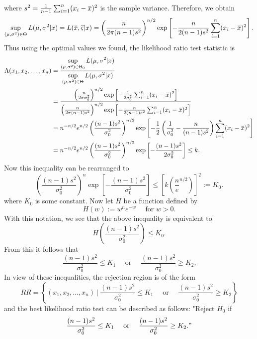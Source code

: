 where $s^2 = \frac{1}{n-1} \sum_{i=1}^{n} (x_i - \ols{x})^2$ is the sample variance. Therefore, we obtain
\[
    \sup_{(\mu, \sigma^2) \in \Theta} L(\mu, \sigma^2 | x) = L(\ols{x}, \widehat{\varsigma} | x) 
    = \left(\frac{n}{2\pi (n-1)s^2} \right)^{n/2} \exp\left[-\frac{n}{2(n-1)s^2} \sum_{i=1}^{n} (x_i - \ols{x})^2 \right].
\]
Thus using the optimal values we found, the likelihood ratio test statistic is
\begin{align*}
    \Lambda(x_1, x_2, \ldots, x_n) &= \frac{\displaystyle \sup_{(\mu, \sigma^2) \in \Theta_0} L(\mu, \sigma^2 | x)}{\displaystyle \sup_{(\mu, \sigma^2) \in \Theta} L(\mu, \sigma^2 | x)}\\
    &= \frac{\left(\frac{n}{2\pi \sigma^2_0} \right)^{n/2} \exp\left[-\frac{1}{2 \sigma^2_0} \sum_{i=1}^{n} (x_i - \ols{x})^2 \right]}{\left(\frac{n}{2\pi (n-1)s^2} \right)^{n/2} \exp\left[-\frac{n}{2(n-1)s^2} \sum_{i=1}^{n} (x_i - \ols{x})^2 \right]}\\
    &= n^{-n/2} e^{n/2} \left(\frac{(n-1)s^2}{\sigma^2_0}\right)^{n/2} \exp\left[-\frac{1}{2} \left(\frac{1}{\sigma^2_0} - \frac{n}{(n-1)s^2}\right) \sum_{i=1}^{n} (x_i - \ols{x})^2 \right]\\
    &= n^{-n/2} e^{n/2} \left(\frac{(n-1)s^2}{\sigma^2_0}\right)^{n/2} \exp\left[ - \frac{(n-1)s^2}{2\sigma^2_0}\right] \leq k.
\end{align*}
Now this inequality can be rearranged to
\[
    \left(\frac{(n-1)s^2}{\sigma^2_0}\right)^n \exp \left[-\frac{(n-1)s^2}{\sigma^2_0}\right] \leq \left[ k \left( \frac{n}{e}^{n/2} \right) \right]^2 := K_0.
\]
where $K_0$ is some constant. Now let $H$ be a function defined by
\[
    H(w) := w^n e^{-w} \quad \text{ for } w > 0.
\]
With this notation, we see that the above inequality is equivalent to
\[
    H\left(\frac{(n-1)s^2}{\sigma^2_0}\right) \leq K_0.
\]
From this it follows that 
\[
    \frac{(n-1)s^2}{\sigma^2_0} \leq K_1 \quad \text{ or } \quad \frac{(n-1)s^2}{\sigma^2_0} \geq K_2.
\]
In view of these inequalities, the rejection region is of the form
\begin{equation}
    RR = \left\{ (x_1, x_2, \ldots, x_n) \> \bigg \vert \> \frac{(n-1)s^2}{\sigma^2_0} \leq K_1 \quad \text{ or } \quad \frac{(n-1)s^2}{\sigma^2_0} \geq K_2 \right\}
\end{equation}
and the best likelihood ratio test can be described as follows: "Reject $H_0$ if
\begin{equation}
    \frac{(n-1)s^2}{\sigma^2_0} \leq K_1 \quad \text{ or } \quad \frac{(n-1)s^2}{\sigma^2_0} \geq K_2."
\end{equation}


